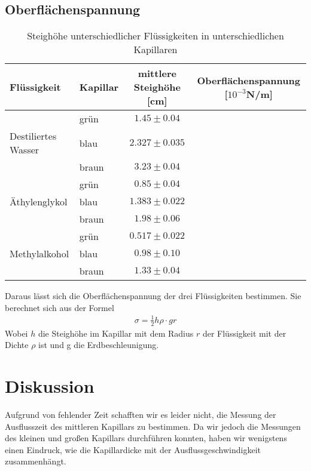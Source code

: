 \documentclass[12pt,a4paper,titlepage,headinclude,bibtotoc]{scrartcl}
\begin{document}
\subsection{Oberflächenspannung}
\begin{table}[!h]
\centering
\begin{tabular}{|l|l|c|c|}
\hline
Flüssigkeit 		&Kapillar & mittlere Steighöhe [cm]	& Oberflächenspannung [$10^{-3}$N/m]\\\hline\hline
			&grün	& $1.45\pm 0.04$		&\\
Destiliertes Wasser	&blau	& $2.327\pm 0.035$		&\\
                        &braun  & $3.23\pm 0.04$		&\\
\hline
			&grün	& $0.85\pm 0.04$		&\\
Äthylenglykol		&blau	& $1.383\pm 0.022$		&\\
			&braun	& $1.98\pm 0.06$		&\\
\hline
			&grün	& $0.517\pm 0.022$		&\\
Methylalkohol		&blau	& $0.98\pm 0.10$		&\\
			&braun	& $1.33\pm 0.04$		&\\
\hline
\end{tabular}
\caption{Steighöhe unterschiedlicher Flüssigkeiten in unterschiedlichen Kapillaren}
\end{table}
Daraus lässt sich die Oberflächenspannung der drei Flüssigkeiten bestimmen.
Sie berechnet sich aus der Formel
\begin{align}
\sigma=\frac{1}{2}h\rho\cdot g r
\end{align} 
Wobei $h$ die Steighöhe im Kapillar mit dem Radius $r$ der Flüssigkeit mit der Dichte $\rho$ ist und g die Erdbeschleunigung.
\section{Diskussion}
\label{sec:diskussion}
Aufgrund von fehlender Zeit schafften wir es leider nicht, die Messung der Ausflusszeit des mittleren Kapillars zu bestimmen.
Da wir jedoch die Messungen des kleinen und großen Kapillars durchführen konnten, haben wir wenigstens einen Eindruck, wie die Kapillardicke mit der Ausflussgeschwindigkeit zusammenhängt.
\end{document}
